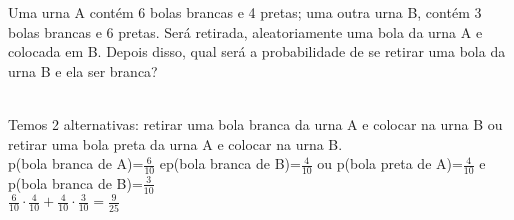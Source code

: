 \begin{ex}
 Uma urna A contém 6 bolas brancas e 4 pretas; uma outra urna B, contém 3 bolas brancas e 6 pretas. Será retirada, aleatoriamente uma bola da urna A e colocada em B. Depois disso, qual será a probabilidade de se retirar uma bola da urna B e ela ser branca?
    \begin{sol}
        \phantom{A} \\
    Temos 2 alternativas: retirar uma bola branca da urna A e colocar na urna B ou  retirar uma bola preta da urna A e colocar na urna B.\\
    p(bola branca de A)=$\frac{6}{10}$\hspace{0.15cm} e\hspace{0.2cm}p(bola branca de B)=$\frac{4}{10}$ \hspace{0.2cm} ou \hspace{0.2cm}
    p(bola preta de A)=$\frac{4}{10}$\hspace{0.2cm} e \hspace{0.2cm} p(bola branca de B)=$\frac{3}{10}$\\
    $\frac{6}{10}\cdot\frac{4}{10}+\frac{4}{10}\cdot\frac{3}{10}= \frac{9}{25}$
   
    \end{sol}
 
\end{ex}